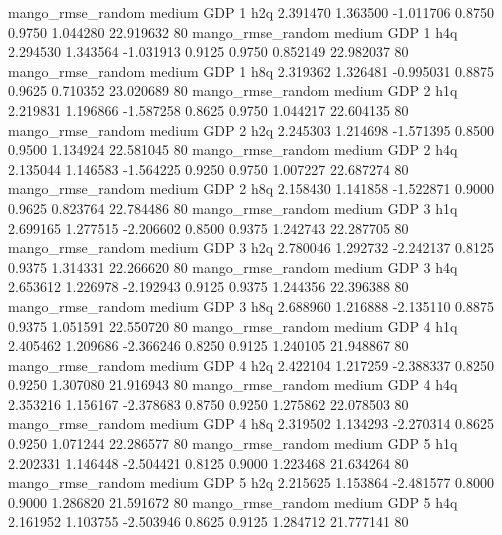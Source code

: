 mango_rmse_random     medium      GDP                 1                  h2q  2.391470 1.363500 -1.011706 0.8750 0.9750  1.044280   22.919632 80
mango_rmse_random     medium      GDP                 1                  h4q  2.294530 1.343564 -1.031913 0.9125 0.9750  0.852149   22.982037 80
mango_rmse_random     medium      GDP                 1                  h8q  2.319362 1.326481 -0.995031 0.8875 0.9625  0.710352   23.020689 80
mango_rmse_random     medium      GDP                 2                  h1q  2.219831 1.196866 -1.587258 0.8625 0.9750  1.044217   22.604135 80
mango_rmse_random     medium      GDP                 2                  h2q  2.245303 1.214698 -1.571395 0.8500 0.9500  1.134924   22.581045 80
mango_rmse_random     medium      GDP                 2                  h4q  2.135044 1.146583 -1.564225 0.9250 0.9750  1.007227   22.687274 80
mango_rmse_random     medium      GDP                 2                  h8q  2.158430 1.141858 -1.522871 0.9000 0.9625  0.823764   22.784486 80
mango_rmse_random     medium      GDP                 3                  h1q  2.699165 1.277515 -2.206602 0.8500 0.9375  1.242743   22.287705 80
mango_rmse_random     medium      GDP                 3                  h2q  2.780046 1.292732 -2.242137 0.8125 0.9375  1.314331   22.266620 80
mango_rmse_random     medium      GDP                 3                  h4q  2.653612 1.226978 -2.192943 0.9125 0.9375  1.244356   22.396388 80
mango_rmse_random     medium      GDP                 3                  h8q  2.688960 1.216888 -2.135110 0.8875 0.9375  1.051591   22.550720 80
mango_rmse_random     medium      GDP                 4                  h1q  2.405462 1.209686 -2.366246 0.8250 0.9125  1.240105   21.948867 80
mango_rmse_random     medium      GDP                 4                  h2q  2.422104 1.217259 -2.388337 0.8250 0.9250  1.307080   21.916943 80
mango_rmse_random     medium      GDP                 4                  h4q  2.353216 1.156167 -2.378683 0.8750 0.9250  1.275862   22.078503 80
mango_rmse_random     medium      GDP                 4                  h8q  2.319502 1.134293 -2.270314 0.8625 0.9250  1.071244   22.286577 80
mango_rmse_random     medium      GDP                 5                  h1q  2.202331 1.146448 -2.504421 0.8125 0.9000  1.223468   21.634264 80
mango_rmse_random     medium      GDP                 5                  h2q  2.215625 1.153864 -2.481577 0.8000 0.9000  1.286820   21.591672 80
mango_rmse_random     medium      GDP                 5                  h4q  2.161952 1.103755 -2.503946 0.8625 0.9125  1.284712   21.777141 80
